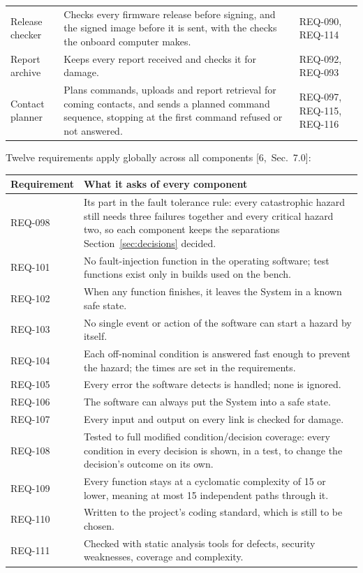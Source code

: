 \documentclass[11pt,a4paper]{article}
\begin{document}
{\begin{xltabular}{\textwidth}{@{}>{\raggedright\arraybackslash}p{2.9cm}>{\raggedright\arraybackslash}X>{\raggedright\arraybackslash}p{3.6cm}@{}}
Release checker & Checks every firmware release before signing, and the signed image before it is sent, with the checks the onboard computer makes. & REQ-090, REQ-114 \\
Report archive & Keeps every report received and checks it for damage. & REQ-092, REQ-093 \\
Contact planner & Plans commands, uploads and report retrieval for coming contacts, and sends a planned command sequence, stopping at the first command refused or not answered. & REQ-097, REQ-115, REQ-116 \\
\bottomrule
\end{xltabular}}

\medskip
\noindent Twelve requirements apply globally across all components
[6,~Sec.~7.0]:

{\footnotesize
\begin{xltabular}{\textwidth}{@{}l>{\raggedright\arraybackslash}X@{}}
\toprule
Requirement & What it asks of every component \\
\midrule
\endhead
REQ-098 & Its part in the fault tolerance rule: every catastrophic hazard still needs three failures together and every critical hazard two, so each component keeps the separations Section~\ref{sec:decisions} decided. \\
REQ-101 & No fault-injection function in the operating software; test functions exist only in builds used on the bench. \\
REQ-102 & When any function finishes, it leaves the System in a known safe state. \\
REQ-103 & No single event or action of the software can start a hazard by itself. \\
REQ-104 & Each off-nominal condition is answered fast enough to prevent the hazard; the times are set in the requirements. \\
REQ-105 & Every error the software detects is handled; none is ignored. \\
REQ-106 & The software can always put the System into a safe state. \\
REQ-107 & Every input and output on every link is checked for damage. \\
REQ-108 & Tested to full modified condition/decision coverage: every condition in every decision is shown, in a test, to change the decision's outcome on its own. \\
REQ-109 & Every function stays at a cyclomatic complexity of 15 or lower, meaning at most 15 independent paths through it. \\
REQ-110 & Written to the project's coding standard, which is still to be chosen. \\
REQ-111 & Checked with static analysis tools for defects, security weaknesses, coverage and complexity. \\
\bottomrule
\end{xltabular}}
\end{document}
